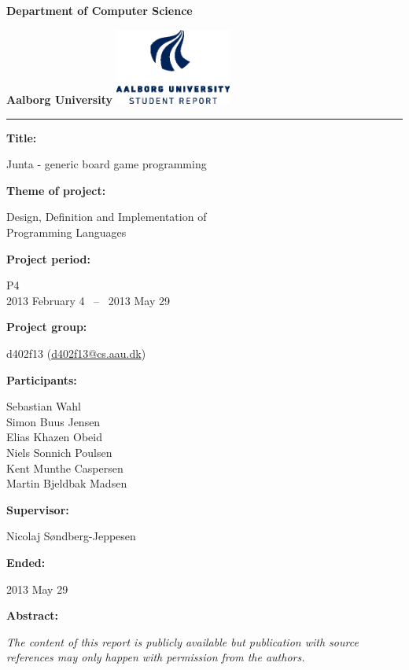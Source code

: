 \begin{nopagebreak}
  \begin{minipage}{\textwidth}
    \vspace{2cm}
\LARGE{\textbf{Department of Computer Science}}\vspace{-2.1cm}

\large{\textbf{Aalborg University}}
\hspace{8.30cm}\includegraphics[height=2.5cm]{pictures/aau_logo_en_blue.eps}
\end{minipage}
\vspace{0.1cm}
\hrule

\newcommand{\titleitem}[2]{\textbf{#1:}

\hspace*{0.5cm}
\begin{minipage}{0.9\columnwidth}#2\end{minipage}
\vspace{0.25cm}}
\begin{multicols}{2}

\titleitem{Title}{Junta - generic board game programming}

\titleitem{Theme of project}{Design, Definition and Implementation of \\Programming Languages}

\titleitem{Project period}{P4\\2013 February 4 ~--~ 2013 May 29}

\titleitem{Project group}{d402f13 (\url{d402f13@cs.aau.dk})}

\titleitem{Participants}{
    Sebastian Wahl\\
    Simon Buus Jensen\\
    Elias Khazen Obeid\\
    Niels Sonnich Poulsen\\
    Kent Munthe Caspersen\\
    Martin Bjeldbak Madsen
}

\titleitem{Supervisor}{Nicolaj Søndberg-Jeppesen}

\titleitem{Ended}{2013 May 29}

\vfill
\columnbreak

\titleitem{Abstract}{}

\end{multicols}
\vfill
\centering
\textit{The content of this report is publicly available but publication with source references may only happen with permission from the authors.}
\end{nopagebreak}
